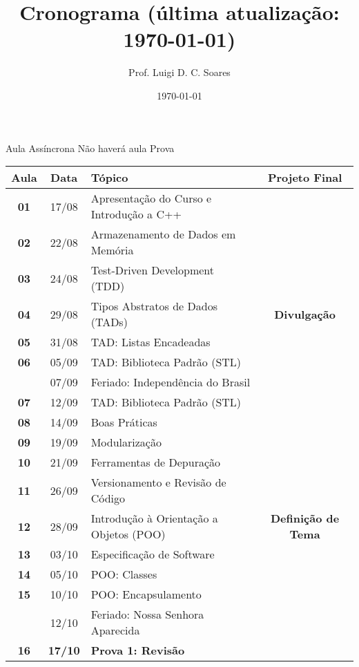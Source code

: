 \documentclass[11pt]{article}
\author{Prof. Luigi D. C. Soares}
\date{\today}
\title{Cronograma (\color{red}\bfseries última atualização: \today\color{black})}
\begin{document}
\begin{center}
    \Large\bfseries\thetitle{}
\end{center}

\begin{center}
    \quad Aula Assíncrona \qquad
    \quad Não haverá aula \qquad
    \quad Prova
\end{center}

\begin{center}
\begin{tabular}{>{\bfseries}ccl>{\bfseries}c}
\toprule
\textbf{Aula} & \textbf{Data} & \textbf{Tópico} & \textbf{Projeto Final}\\[0pt]
\midrule
01 & 17/08 & Apresentação do Curso e Introdução a C++ & \\[0pt]
02 & 22/08 & Armazenamento de Dados em Memória & \\[0pt]
03 & 24/08 & Test-Driven Development (TDD) & \\[0pt]
04 & 29/08 & Tipos Abstratos de Dados (TADs) & Divulgação\\[0pt]
05 & 31/08 & TAD: Listas Encadeadas & \\[0pt]
06 & 05/09 & TAD: Biblioteca Padrão (STL) & \\[0pt]
\rowcolor{green!40} & 07/09 & Feriado: Independência do Brasil & \\[0pt]
07 & 12/09 & TAD: Biblioteca Padrão (STL) & \\[0pt]
08 & 14/09 & Boas Práticas & \\[0pt]
09 & 19/09 & Modularização & \\[0pt]
10 & 21/09 & Ferramentas de Depuração & \\[0pt]
\rowcolor{violet!40} 11 & 26/09 & Versionamento e Revisão de Código & \\[0pt]
12 & 28/09 & Introdução à Orientação a Objetos (POO) & Definição de Tema\\[0pt]
13 & 03/10 & Especificação de Software & \\[0pt]
14 & 05/10 & POO: Classes & \\[0pt]
15 & 10/10 & POO: Encapsulamento & \\[0pt]
\rowcolor{green!40} & 12/10 & Feriado: Nossa Senhora Aparecida & \\[0pt]
\rowcolor{yellow!50} 16 & \textbf{17/10} & \textbf{Prova 1: Revisão} & \\[0pt]

\end{tabular}
\end{center}
\end{document}
